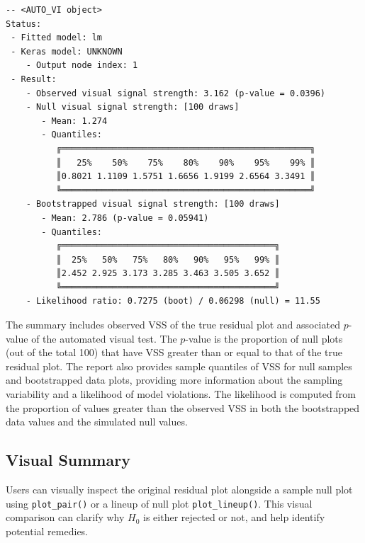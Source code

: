 \documentclass[
doublespace,
  times]{anzsauth}
\newenvironment{Shaded}{\begin{snugshade}}{\end{snugshade}}
\newcommand{\FunctionTok}[1]{\textcolor[rgb]{0.28,0.35,0.67}{#1}}
\newcommand{\NormalTok}[1]{\textcolor[rgb]{0.00,0.23,0.31}{#1}}
\newcommand{\SpecialCharTok}[1]{\textcolor[rgb]{0.37,0.37,0.37}{#1}}
\begin{document}
\begin{verbatim}
-- <AUTO_VI object>
Status:
 - Fitted model: lm
 - Keras model: UNKNOWN
    - Output node index: 1
 - Result:
    - Observed visual signal strength: 3.162 (p-value = 0.0396)
    - Null visual signal strength: [100 draws]
       - Mean: 1.274
       - Quantiles: 
          ╔═════════════════════════════════════════════════╗
          ║   25%    50%    75%    80%    90%    95%    99% ║
          ║0.8021 1.1109 1.5751 1.6656 1.9199 2.6564 3.3491 ║
          ╚═════════════════════════════════════════════════╝
    - Bootstrapped visual signal strength: [100 draws]
       - Mean: 2.786 (p-value = 0.05941)
       - Quantiles: 
          ╔══════════════════════════════════════════╗
          ║  25%   50%   75%   80%   90%   95%   99% ║
          ║2.452 2.925 3.173 3.285 3.463 3.505 3.652 ║
          ╚══════════════════════════════════════════╝
    - Likelihood ratio: 0.7275 (boot) / 0.06298 (null) = 11.55 
\end{verbatim}

The summary includes observed VSS of the true residual plot and
associated \(p\)-value of the automated visual test. The \(p\)-value is
the proportion of null plots (out of the total 100) that have VSS
greater than or equal to that of the true residual plot. The report also
provides sample quantiles of VSS for null samples and bootstrapped data
plots, providing more information about the sampling variability and a
likelihood of model violations. The likelihood is computed from the
proportion of values greater than the observed VSS in both the
bootstrapped data values and the simulated null values.

\subsection{Visual Summary}\label{sec-autovi-visual}

Users can visually inspect the original residual plot alongside a sample
null plot using \texttt{plot\_pair()} or a lineup of null plot
\texttt{plot\_lineup()}. This visual comparison can clarify why \(H_0\)
is either rejected or not, and help identify potential remedies.

\begin{Shaded}
\end{Shaded}
\end{document}
